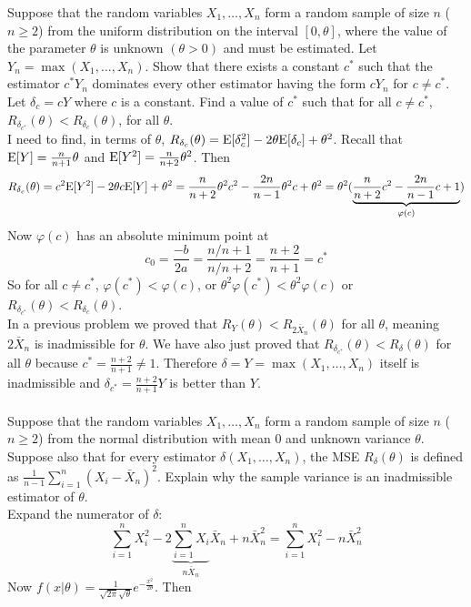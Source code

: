 \documentclass[12pt]{article}
\begin{document}
Suppose that the random variables $X_1,\dots,X_n$ form a random sample of size $n$ ($n \geq 2$) from the uniform distribution on the interval $[0,\theta]$, where the value of the parameter $\theta$ is unknown $(\theta > 0)$ and must be estimated. Let $Y_n = \max(X_1,\dots,X_n)$. Show that there exists a constant $c^*$ such that the estimator $c^*Y_n$ dominates every other estimator having the form $cY_n$ for $c \neq c^*$. \\
Let $\delta_c = cY$ where $c$ is a constant. Find a value of $c^*$ such that for all $c \neq c^*$, $R_{\delta_{c^*}}(\theta) < R_{\delta_c}(\theta)$, for all $\theta$. \\
I need to find, in terms of $\theta$, $R_{\delta_c}(\theta) = \mathrm{E}[ \delta_c^2 ] - 2\theta\mathrm{E}[ \delta_c ] + \theta^2$. Recall that $\mathrm{E}[ Y ] = \frac{n}{n+1}\theta$ and $\mathrm{E}[ Y^2 ] = \frac{n}{n+2}\theta^2$. Then $$R_{\delta_c}(\theta) = c^2\mathrm{E}[ Y^2 ] - 2\theta c\mathrm{E}[ Y ] + \theta^2 = \frac{n}{n+2}\theta^2c^2 - \frac{2n}{n-1}\theta^2c + \theta^2 = \theta^2(\underbrace{\frac{n}{n+2}c^2 - \frac{2n}{n-1}c + 1}_{\varphi(c)}) $$ Now $\varphi(c)$ has an absolute minimum point at $$c_0 = \frac{-b}{2a} = \frac{n/n+1}{n/n+2} = \frac{n+2}{n+1} = c^*$$ So for all $c \neq c^*$, $\varphi(c^*) < \varphi(c)$, or $\theta^2\varphi(c^*) < \theta^2\varphi(c)$ or $R_{\delta_{c^*}}(\theta) < R_{\delta_c}(\theta)$. \\
In a previous problem we proved that $R_Y(\theta) < R_{2\bar{X}_n}(\theta)$ for all $\theta$, meaning $2\bar{X}_n$ is inadmissible for $\theta$. We have also just proved that $R_{\delta_{c^*}}(\theta) < R_{\delta}(\theta)$ for all $\theta$ because $c^* = \frac{n+2}{n+1} \neq 1$. Therefore $\delta = Y = \max(X_1,\dots,X_n)$ itself is inadmissible and $\delta_{c^*} = \frac{n+2}{n+1}Y$ is better than $Y$. \\~\\
Suppose that the random variables $X_1,\dots,X_n$ form a random sample of size $n$ ($n \geq 2$) from the normal distribution with mean $0$ and unknown variance $\theta$. Suppose also that for every estimator $\delta(X_1,\dots,X_n)$, the MSE $R_\delta(\theta)$ is defined as $\frac{1}{n-1}\sum_{i=1}^n (X_i - \bar{X}_n)^2$. Explain why the sample variance is an inadmissible estimator of $\theta$. \\
Expand the numerator of $\delta$: $$ \sum_{i=1}^n X_i^2 - 2\underbrace{\sum_{i=1}^n X_i}_{n\bar{X}_n}\bar{X}_n + n\bar{X}_n^2 = \sum_{i=1}^n X_i^2 - n\bar{X}_n^2 $$ 
Now $f(x|\theta) = \frac{1}{\sqrt{2\pi} \sqrt{\theta}}e^{-\frac{x^2}{2\theta}}$. Then 
\end{document}
